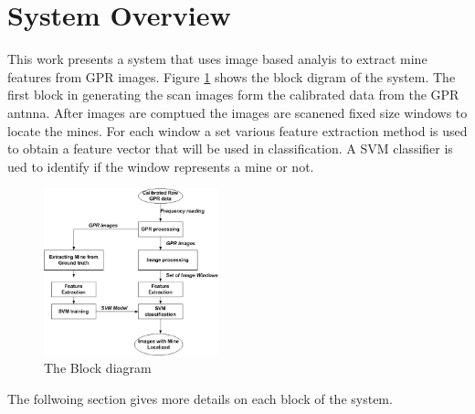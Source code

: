 \documentclass[conference]{IEEEtran}
\begin{document}
\section {System Overview}
\label{sec:system}


This work presents a system that uses image based analyis to extract mine features from GPR images. Figure \ref{fig:block}
shows the block digram of the system. The first block in generating the scan images form the calibrated data from the GPR antnna. After images are comptued the images are scanened fixed size windows to locate the mines. For each window a set various feature extraction method is used to obtain a feature vector that will be used in classification. A SVM classifier is ued to identify if the window represents a mine or not.  %
 \begin{figure}
\centering
\label{fig:block}
\includegraphics[width=0.45\textwidth]{images/BlockDiagram.jpg}
 \caption{The Block diagram }
\end{figure}

The follwoing section gives more details on each block of the system.
\end{document}
